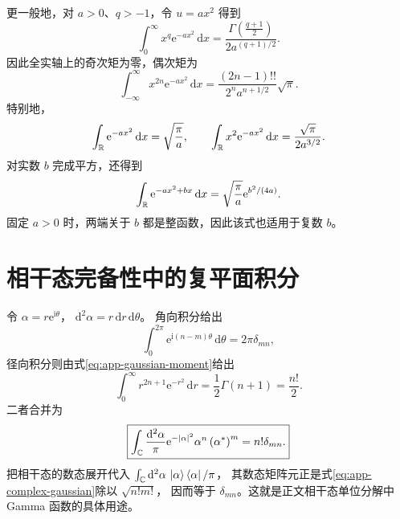 更一般地，对 $a>0$、$q>-1$，令 $u=ax^2$ 得到
\begin{equation}
\boxed{\int_0^\infty x^q\mathrm{e}^{-ax^2}\,\mathrm{d}x
=\frac{\Gamma\left(\frac{q+1}{2}\right)}{2a^{\left(q+1\right)/2}}.}
\label{eq:app-gaussian-moment}
\end{equation}
因此全实轴上的奇次矩为零，偶次矩为
\begin{equation}
\int_{-\infty}^{\infty}x^{2n}\mathrm{e}^{-ax^2}\,\mathrm{d}x
=\frac{\left(2n-1\right)!!}{2^n a^{n+1/2}}\sqrt\pi.
\end{equation}
特别地，
\begin{equation}
\int_{\mathbb{R}}\mathrm{e}^{-ax^2}\,\mathrm{d}x=\sqrt{\frac{\pi}{a}},
\qquad
\int_{\mathbb{R}}x^2\mathrm{e}^{-ax^2}\,\mathrm{d}x
=\frac{\sqrt\pi}{2a^{3/2}}.
\end{equation}
对实数 $b$ 完成平方，还得到
\begin{equation}
\int_{\mathbb{R}}\mathrm{e}^{-ax^2+bx}\,\mathrm{d}x
=\sqrt{\frac{\pi}{a}}\mathrm{e}^{b^2/\left(4a\right)}.
\label{eq:app-shifted-gaussian}
\end{equation}
固定 $a>0$ 时，两端关于 $b$ 都是整函数，因此该式也适用于复数 $b$。

\section{相干态完备性中的复平面积分}
令 $\alpha=r\mathrm{e}^{\mathrm{i}\theta}$，
$\mathrm{d}^2\alpha=r\,\mathrm{d}r\,\mathrm{d}\theta$。
角向积分给出
\begin{equation}
\int_0^{2\pi}\mathrm{e}^{\mathrm{i}\left(n-m\right)\theta}\,\mathrm{d}\theta
=2\pi\delta_{mn},
\end{equation}
径向积分则由式\eqref{eq:app-gaussian-moment}给出
\begin{equation}
\int_0^\infty r^{2n+1}\mathrm{e}^{-r^2}\,\mathrm{d}r
=\frac12\Gamma\left(n+1\right)=\frac{n!}{2}.
\end{equation}
二者合并为
\begin{equation}
\boxed{\int_{\mathbb{C}}\frac{\mathrm{d}^2\alpha}{\pi}
\mathrm{e}^{-\left|\alpha\right|^2}
\alpha^n\left(\alpha^*\right)^m=n!\delta_{mn}.}
\label{eq:app-complex-gaussian}
\end{equation}
把相干态的数态展开代入
$\int_{\mathbb{C}}\mathrm{d}^2\alpha\,\Ket{\alpha}\Bra{\alpha}/\pi$，
其数态矩阵元正是式\eqref{eq:app-complex-gaussian}除以 $\sqrt{n!m!}$，
因而等于 $\delta_{mn}$。这就是正文相干态单位分解中 Gamma 函数的具体用途。

